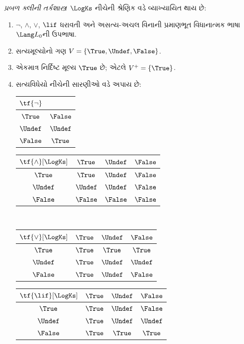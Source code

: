 \begin{defn}
\emph{પ્રબળ ક્લીની તર્કશાસ્ત્ર}~$\LogKs$ નીચેની શ્રેણિક વડે વ્યાખ્યાયિત થાય છે:
\begin{enumerate}
  \item $\lnot$, $\land$, $\lor$, $\lif$ ધરાવતી અને
  અસત્ય-અચલ વિનાની પ્રમાણભૂત વિધાનાત્મક ભાષા~$\Lang L_0$ની ઉપભાષા.
  \item સત્યમૂલ્યોનો ગણ $V = \{\True, \Undef, \False\}$.
  \item એકમાત્ર નિર્દિષ્ટ મૂલ્ય $\True$ છે; એટલે $V^+ = \{\True\}$.
  \item સત્યવિધેયો નીચેની સારણીઓ વડે અપાય છે:
  \begin{center}
    \begin{tabular}{c|c}
      $\tf{\lnot}$ & \\
      \hline
      $\True$ & $\False$ \\
      $\Undef$ & $\Undef$ \\
      $\False$ & $\True$
    \end{tabular}
    \quad
    \begin{tabular}{c|ccc}
      $\tf{\land}[\LogKs]$ & $\True$ & $\Undef$ & $\False$ \\
      \hline
      $\True$ & $\True$ & $\Undef$ & $\False$ \\
      $\Undef$ & $\Undef$ & $\Undef$ & $\False$\\
      $\False$ & $\False$ & $\False$ & $\False$
    \end{tabular}
    \\[2ex]
    \begin{tabular}{c|ccc}
      $\tf{\lor}[\LogKs]$ & $\True$ & $\Undef$ & $\False$ \\
      \hline
      $\True$ & $\True$ & $\True$ & $\True$ \\
      $\Undef$ & $\True$ & $\Undef$ & $\Undef$ \\
      $\False$ & $\True$ & $\Undef$ & $\False$
    \end{tabular}
    \quad
    \begin{tabular}{c|ccc}
      $\tf{\lif}[\LogKs]$ & $\True$ & $\Undef$ & $\False$ \\
      \hline
      $\True$ & $\True$ & $\Undef$ & $\False$ \\
      $\Undef$ & $\True$ & $\Undef$ & $\Undef$ \\
      $\False$ & $\True$ & $\True$ & $\True$
    \end{tabular}
  \end{center}
\end{enumerate}
\end{defn}

